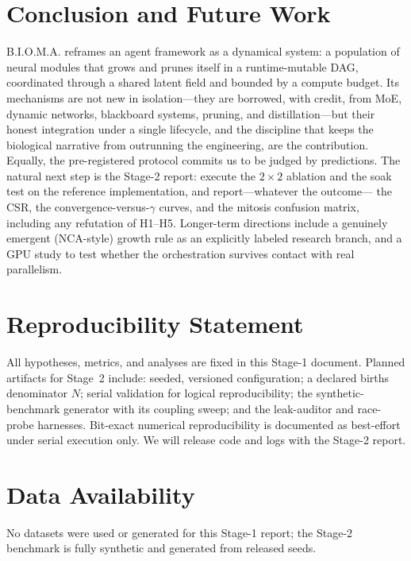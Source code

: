 \documentclass[11pt]{article}
\newcommand{\bioma}{\textsc{B.I.O.M.A.}}
\begin{document}
\section{Conclusion and Future Work}
\bioma{} reframes an agent framework as a dynamical system: a population of
neural modules that grows and prunes itself in a runtime-mutable DAG,
coordinated through a shared latent field and bounded by a compute budget. Its
mechanisms are not new in isolation---they are borrowed, with credit, from MoE,
dynamic networks, blackboard systems, pruning, and distillation---but their
honest integration under a single lifecycle, and the discipline that keeps the
biological narrative from outrunning the engineering, are the contribution.
Equally, the pre-registered protocol commits us to be judged by predictions. The
natural next step is the Stage-2 report: execute the $2\times2$ ablation and the
soak test on the reference implementation, and report---whatever the outcome---%
the CSR, the convergence-versus-$\gamma$ curves, and the mitosis confusion
matrix, including any refutation of H1--H5. Longer-term directions include a
genuinely emergent (NCA-style) growth rule as an explicitly labeled research
branch, and a GPU study to test whether the orchestration survives contact with
real parallelism.

\section*{Reproducibility Statement}
All hypotheses, metrics, and analyses are fixed in this Stage-1 document.
Planned artifacts for Stage~2 include: seeded, versioned configuration; a
declared births denominator $N$; serial validation for logical reproducibility;
the synthetic-benchmark generator with its coupling sweep; and the leak-auditor
and race-probe harnesses. Bit-exact numerical reproducibility is documented as
best-effort under serial execution only. We will release code and logs with the
Stage-2 report.

\section*{Data Availability}
No datasets were used or generated for this Stage-1 report; the Stage-2
benchmark is fully synthetic and generated from released seeds.
\end{document}
